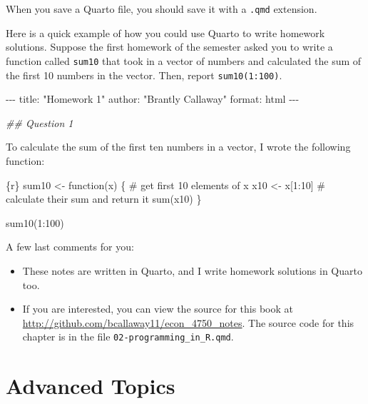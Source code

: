 \documentclass[
  letterpaper,
  DIV=11,
  numbers=noendperiod]{scrreprt}
\newenvironment{Shaded}{\begin{snugshade}}{\end{snugshade}}
\newcommand{\AttributeTok}[1]{\textcolor[rgb]{0.40,0.45,0.13}{#1}}
\newcommand{\ControlFlowTok}[1]{\textcolor[rgb]{0.00,0.23,0.31}{#1}}
\newcommand{\DocumentationTok}[1]{\textcolor[rgb]{0.37,0.37,0.37}{\textit{#1}}}
\newcommand{\NormalTok}[1]{\textcolor[rgb]{0.00,0.23,0.31}{#1}}
\newcommand{\SpecialCharTok}[1]{\textcolor[rgb]{0.37,0.37,0.37}{#1}}
\newcommand{\StringTok}[1]{\textcolor[rgb]{0.13,0.47,0.30}{#1}}
\begin{document}
When you save a Quarto file, you should save it with a \texttt{.qmd}
extension.

Here is a quick example of how you could use Quarto to write homework
solutions. Suppose the first homework of the semester asked you to write
a function called \texttt{sum10} that took in a vector of numbers and
calculated the sum of the first 10 numbers in the vector. Then, report
\texttt{sum10(1:100)}.

\begin{Shaded}
\begin{Highlighting}[]
\SpecialCharTok{{-}{-}{-}}
\NormalTok{title}\SpecialCharTok{:} \StringTok{"Homework 1"}
\NormalTok{author}\SpecialCharTok{:} \StringTok{"Brantly Callaway"}
\NormalTok{format}\SpecialCharTok{:}\NormalTok{ html}
\SpecialCharTok{{-}{-}{-}}

\DocumentationTok{\#\# Question 1}

\NormalTok{To calculate the sum of the first ten numbers }\ControlFlowTok{in}\NormalTok{ a vector, }
\NormalTok{I wrote the following }\ControlFlowTok{function}\SpecialCharTok{:}

\StringTok{\textasciigrave{}\textasciigrave{}\textasciigrave{}}\AttributeTok{\{r\}}
\AttributeTok{sum10 \textless{}{-} function(x) \{}
\AttributeTok{  \# get first 10 elements of x}
\AttributeTok{  x10 \textless{}{-} x[1:10] }
\AttributeTok{  \# calculate their sum and return it}
\AttributeTok{  sum(x10) }
\AttributeTok{\}}

\AttributeTok{sum10(1:100)}
\StringTok{\textasciigrave{}\textasciigrave{}\textasciigrave{}}
\end{Highlighting}
\end{Shaded}

A few last comments for you:

\begin{itemize}
\item
  These notes are written in Quarto, and I write homework solutions in
  Quarto too.
\item
  If you are interested, you can view the source for this book at
  \url{http://github.com/bcallaway11/econ_4750_notes}. The source code
  for this chapter is in the file \texttt{02-programming\_in\_R.qmd}.
\end{itemize}

\section{Advanced Topics}\label{advanced-topics}
\end{document}
